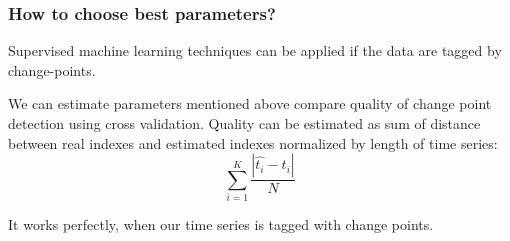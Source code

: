 \documentclass[intlimits, 9pt, unicode]{beamer}
\begin{document}
	
	


    





\begin{frame}
    \frametitle{How to choose best parameters?}


Supervised machine learning techniques can be applied if the data are tagged by change-points.
\newline

We can estimate parameters mentioned above compare quality of change point detection using cross validation.
\newline
Quality can be estimated as sum of distance between real indexes and estimated indexes normalized by length of time series: $$\sum_{i=1}^K \frac{|\widehat{t_i} - t_i|}{N}$$	

It works perfectly, when our time series is tagged with change points.

 \end{frame}
\end{document}
